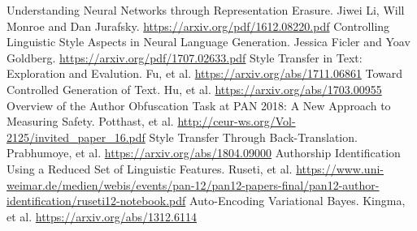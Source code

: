 \documentclass[letterpaper, 10 pt, conference]{ieeeconf}  %
\begin{document}








\begin{thebibliography}{99}

 Understanding Neural Networks through Representation Erasure. Jiwei Li, Will Monroe and Dan Jurafsky. \url{https://arxiv.org/pdf/1612.08220.pdf}
 Controlling Linguistic Style Aspects in Neural Language Generation. Jessica Ficler and Yoav Goldberg. \url{https://arxiv.org/pdf/1707.02633.pdf}
 Style Transfer in Text: Exploration and Evalution. Fu, et al. \url{https://arxiv.org/abs/1711.06861}
 Toward Controlled Generation of Text. Hu, et al. \url{https://arxiv.org/abs/1703.00955}
 Overview of the Author Obfuscation Task at PAN 2018: A New Approach to Measuring Safety. Potthast, et al. \url{http://ceur-ws.org/Vol-2125/invited_paper_16.pdf}
 Style Transfer Through Back-Translation. Prabhumoye, et al. \url{https://arxiv.org/abs/1804.09000}
 Authorship Identification Using a Reduced Set of Linguistic Features. Ruseti, et al. \url{https://www.uni-weimar.de/medien/webis/events/pan-12/pan12-papers-final/pan12-author-identification/ruseti12-notebook.pdf}
 Auto-Encoding Variational Bayes. Kingma, et al. \url{https://arxiv.org/abs/1312.6114}




\end{thebibliography}
\end{document}
